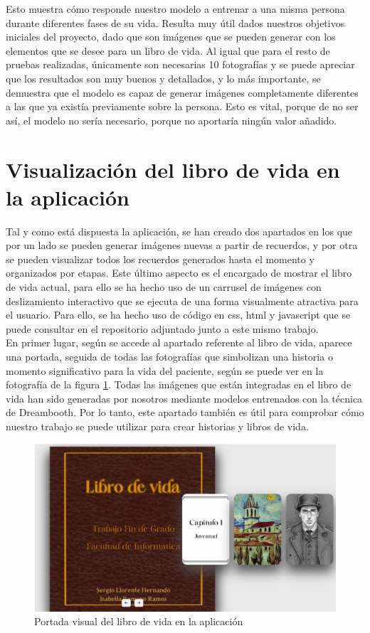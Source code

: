 Esto muestra cómo responde nuestro modelo a entrenar a una misma persona durante diferentes fases de su vida. Resulta muy útil dados nuestros objetivos iniciales del proyecto, dado que son imágenes que se pueden generar con los elementos que se desee para un libro de vida. Al igual que para el resto de pruebas realizadas, únicamente son necesarias 10 fotografías y se puede apreciar que los resultados son muy buenos y detallados, y lo más importante, se demuestra que el modelo es capaz de generar imágenes completamente diferentes a las que ya existía previamente sobre la persona. Esto es vital, porque de no ser así, el modelo no sería necesario, porque no aportaría ningún valor añadido.

\section{Visualización del libro de vida en la aplicación}

Tal y como está dispuesta la aplicación, se han creado dos apartados en los que por un lado se pueden generar imágenes nuevas a partir de recuerdos, y por otra se pueden visualizar todos los recuerdos generados hasta el momento y organizados por etapas. Este último aspecto es el encargado de mostrar el libro de vida actual, para ello se ha hecho uso de un carrusel de imágenes con deslizamiento interactivo que se ejecuta de una forma visualmente atractiva para el usuario. Para ello, se ha hecho uso de código en css, html y javascript que se puede consultar en el repositorio adjuntado junto a este mismo trabajo.\\ 

En primer lugar, según se accede al apartado referente al libro de vida, aparece una portada, seguida de todas las fotografías que simbolizan una historia o momento significativo para la vida del paciente, según se puede ver en la fotografía de la figura \ref{fig:libroapportada}. Todas las imágenes que están integradas en el libro de vida han sido generadas por nosotros mediante modelos entrenados con la técnica de Dreambooth. Por lo tanto, este apartado también es útil para comprobar cómo nuestro trabajo se puede utilizar para crear historias y libros de vida.\\ 

\begin{figure}[!htb]
	\centering
	\includegraphics[width = 0.9
	\textwidth]{Imagenes/Vectorial/librovidaportada.png}
	\caption{Portada visual del libro de vida en la aplicación}
	\label{fig:libroapportada}
\end{figure}

